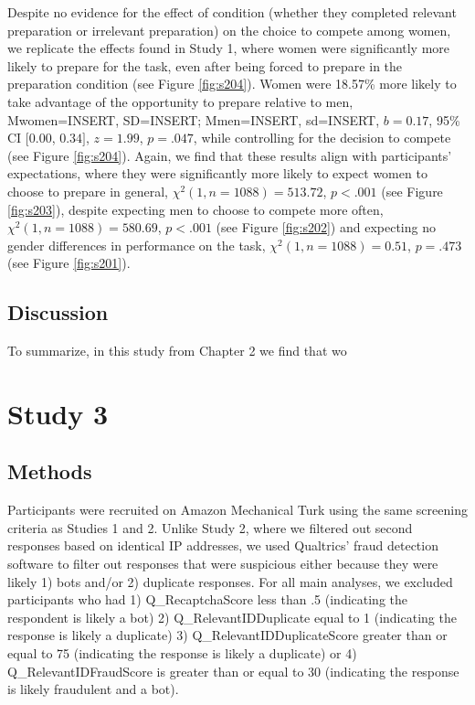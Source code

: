 \documentclass[a4paper, nobind]{templates/ociamthesis}
\begin{document}
Despite no evidence for the effect of condition (whether they completed relevant preparation or irrelevant preparation) on the choice to compete among women, we replicate the effects found in Study 1, where women were significantly more likely to prepare for the task, even after being forced to prepare in the preparation condition (see Figure \ref{fig:s204}). Women were 18.57\% more likely to take advantage of the opportunity to prepare relative to men, Mwomen=INSERT, SD=INSERT; Mmen=INSERT, sd=INSERT, \(b = 0.17\), 95\% CI \([0.00\), \(0.34]\), \(z = 1.99\), \(p = .047\), while controlling for the decision to compete (see Figure \ref{fig:s204}). Again, we find that these results align with participants' expectations, where they were significantly more likely to expect women to choose to prepare in general, \(\chi^2(1, n = 1088) = 513.72\), \(p < .001\) (see Figure \ref{fig:s203}), despite expecting men to choose to compete more often, \(\chi^2(1, n = 1088) = 580.69\), \(p < .001\) (see Figure \ref{fig:s202}) and expecting no gender differences in performance on the task, \(\chi^2(1, n = 1088) = 0.51\), \(p = .473\) (see Figure \ref{fig:s201}).

\hypertarget{discussion-1}{%
\subsection{Discussion}\label{discussion-1}}

To summarize, in this study from Chapter 2 we find that wo

\hypertarget{study-3}{%
\section{Study 3}\label{study-3}}

\hypertarget{methods-2}{%
\subsection{Methods}\label{methods-2}}

Participants were recruited on Amazon Mechanical Turk using the same screening criteria as Studies 1 and 2. Unlike Study 2, where we filtered out second responses based on identical IP addresses, we used Qualtrics' fraud detection software to filter out responses that were suspicious either because they were likely 1) bots and/or 2) duplicate responses. For all main analyses, we excluded participants who had 1) Q\_RecaptchaScore less than .5 (indicating the respondent is likely a bot) 2) Q\_RelevantIDDuplicate equal to 1 (indicating the response is likely a duplicate) 3) Q\_RelevantIDDuplicateScore greater than or equal to 75 (indicating the response is likely a duplicate) or 4) Q\_RelevantIDFraudScore is greater than or equal to 30 (indicating the response is likely fraudulent and a bot).
\end{document}
